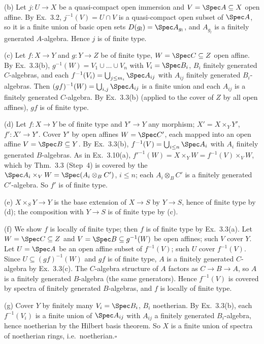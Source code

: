 \documentclass[11pt]{article}
\begin{document}
(b) Let $j:U\to X$ be a quasi-compact open immersion and $V=\Spec A\subseteq X$ open affine. By Ex.~3.2, $j^{-1}(V)=U\cap V$ is a quasi-compact open subset of $\Spec A$, so it is a finite union of basic open sets $D(g_l)=\Spec A_{g_l}$, and $A_{g_l}$ is a finitely generated $A$-algebra. Hence $j$ is of finite type.

(c) Let $f:X\to Y$ and $g:Y\to Z$ be of finite type, $W=\Spec C\subseteq Z$ open affine. By Ex.~3.3(b), $g^{-1}(W)=V_1\cup\dots\cup V_n$ with $V_i=\Spec B_i$, $B_i$ finitely generated $C$-algebras, and each $f^{-1}(V_i)=\bigcup_{j\le m_i}\Spec A_{ij}$ with $A_{ij}$ finitely generated $B_i$-algebras. Then $(gf)^{-1}(W)=\bigcup_{i,j}\Spec A_{ij}$ is a finite union and each $A_{ij}$ is a finitely generated $C$-algebra. By Ex.~3.3(b) (applied to the cover of $Z$ by all open affines), $gf$ is of finite type.

(d) Let $f:X\to Y$ be of finite type and $Y'\to Y$ any morphism; $X'=X\times_YY'$, $f':X'\to Y'$. Cover $Y'$ by open affines $W=\Spec C'$, each mapped into an open affine $V=\Spec B\subseteq Y$. By Ex.~3.3(b), $f^{-1}(V)=\bigcup_{i\le n}\Spec A_i$ with $A_i$ finitely generated $B$-algebras. As in Ex.~3.10(a), $f'^{-1}(W)=X\times_YW=f^{-1}(V)\times_VW$, which by Thm.~3.3 (Step~4) is covered by the $\Spec A_i\times_V W=\Spec(A_i\otimes_BC')$, $i\le n$; each $A_i\otimes_BC'$ is a finitely generated $C'$-algebra. So $f'$ is of finite type.

(e) $X\times_SY\to Y$ is the base extension of $X\to S$ by $Y\to S$, hence of finite type by (d); the composition with $Y\to S$ is of finite type by (c).

(f) We show $f$ is locally of finite type; then $f$ is of finite type by Ex.~3.3(a). Let $W=\Spec C\subseteq Z$ and $V=\Spec B\subseteq g^{-1}(W)$ be open affines; such $V$ cover $Y$. Let $U=\Spec A$ be an open affine subset of $f^{-1}(V)$; such $U$ cover $f^{-1}(V)$. Since $U\subseteq(gf)^{-1}(W)$ and $gf$ is of finite type, $A$ is a finitely generated $C$-algebra by Ex.~3.3(c). The $C$-algebra structure of $A$ factors as $C\to B\to A$, so $A$ is a finitely generated $B$-algebra (the same generators). Hence $f^{-1}(V)$ is covered by spectra of finitely generated $B$-algebras, and $f$ is locally of finite type.

(g) Cover $Y$ by finitely many $V_i=\Spec B_i$, $B_i$ noetherian. By Ex.~3.3(b), each $f^{-1}(V_i)$ is a finite union of $\Spec A_{ij}$ with $A_{ij}$ a finitely generated $B_i$-algebra, hence noetherian by the Hilbert basis theorem. So $X$ is a finite union of spectra of noetherian rings, i.e.\ noetherian.\hfill$\square$
\end{document}
